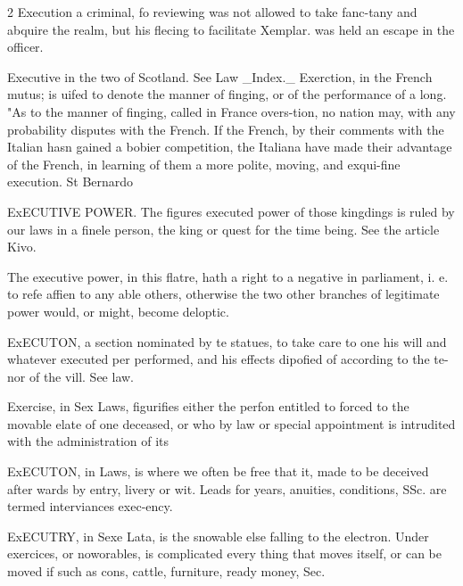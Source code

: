 \documentclass[10pt]{article}
\begin{document}
\begin{multicols}{2}\raggedcolumns
Execution a criminal, fo reviewing was not allowed to take fanc-tany and abquire the realm, but his flecing to facilitate Xemplar. was held an escape in the officer.

Executive in the two of Scotland. See Law \_Index.\_ Exerction, in the French mutus; is uifed to denote the manner of finging, or of the performance of a long. "As to the manner of finging, called in France overs-tion, no nation may, with any probability disputes with the French. If the French, by their comments with the Italian hasn gained a bobier competition, the Italiana have made their advantage of the French, in learning of them a more polite, moving, and exqui-fine execution. St Bernardo

ExECUTIVE POWER. The figures executed power of those kingdings is ruled by our laws in a finele person, the king or quest for the time being. See the article Kivo.

The executive power, in this flatre, hath a right to a negative in parliament, i. e. to refe affien to any able others, otherwise the two other branches of legitimate power would, or might, become deloptic.

ExECUTON, a section nominated by te statues, to take care to one his will and whatever executed per performed, and his effects dipofied of according to the te-nor of the vill. See law.

Exercise, in Sex Laws, figurifies either the perfon entitled to forced to the movable elate of one deceased, or who by law or special appointment is intrudited with the administration of its

ExECUTON, in Laws, is where we often be free that it, made to be deceived after wards by entry, livery or wit. Leads for years, anuities, conditions, SSc. are termed interviances exec-ency.

ExECUTRY, in Sexe Lata, is the snowable else falling to the electron. Under exercices, or noworables, is complicated every thing that moves itself, or can be moved if such as cons, cattle, furniture, ready money, Sec.


\end{multicols}
\end{document}
